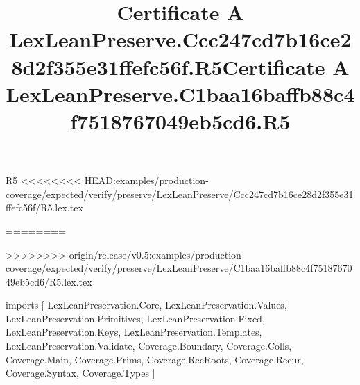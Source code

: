 \begin{lexlean}{R5}
<<<<<<<< HEAD:examples/production-coverage/expected/verify/preserve/LexLeanPreserve/Ccc247cd7b16ce28d2f355e31ffefc56f/R5.lex.tex
\title{Certificate A LexLeanPreserve.Ccc247cd7b16ce28d2f355e31ffefc56f.R5}
========
\title{Certificate A LexLeanPreserve.C1baa16baffb88c4f7518767049eb5cd6.R5}
>>>>>>>> origin/release/v0.5:examples/production-coverage/expected/verify/preserve/LexLeanPreserve/C1baa16baffb88c4f7518767049eb5cd6/R5.lex.tex
\begin{coremodule}
imports [
  LexLeanPreservation.Core,
  LexLeanPreservation.Values,
  LexLeanPreservation.Primitives,
  LexLeanPreservation.Fixed,
  LexLeanPreservation.Keys,
  LexLeanPreservation.Templates,
  LexLeanPreservation.Validate,
  Coverage.Boundary,
  Coverage.Colls,
  Coverage.Main,
  Coverage.Prims,
  Coverage.RecRoots,
  Coverage.Recur,
  Coverage.Syntax,
  Coverage.Types
]


\end{coremodule}
\end{lexlean}
